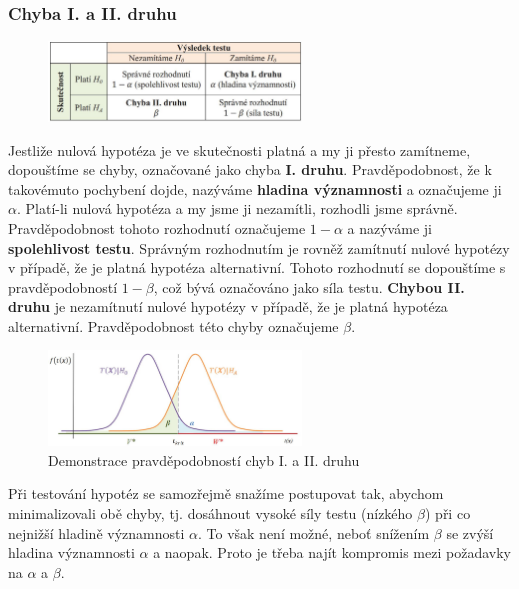 \subsubsection{Chyba I. a II. druhu}
\begin{figure}[H]
\centering
\includegraphics[width=0.6\textwidth]{assets/14_chyba_tab}
\end{figure}
Jestliže nulová hypotéza je ve skutečnosti platná a my ji přesto zamítneme, dopouštíme se chyby, označované jako chyba \textbf{I. druhu}. Pravděpodobnost, že k takovémuto pochybení dojde, nazýváme \textbf{hladina významnosti} a označujeme ji $\alpha$. Platí-li nulová hypotéza a my jsme ji nezamítli, rozhodli jsme správně. Pravděpodobnost tohoto rozhodnutí označujeme $1 − \alpha$ a nazýváme ji \textbf{spolehlivost testu}. Správným rozhodnutím je rovněž zamítnutí nulové hypotézy v případě, že je platná hypotéza alternativní. Tohoto rozhodnutí se dopouštíme s pravděpodobností $1 − \beta$, což bývá označováno jako síla testu. \textbf{Chybou II. druhu} je nezamítnutí nulové hypotézy v případě, že je platná hypotéza alternativní. Pravděpodobnost této chyby označujeme $\beta$.
\begin{figure}[H]
\centering
\includegraphics[width=0.6\textwidth]{assets/14_chyba_graf}
\caption{Demonstrace pravděpodobností chyb I. a II. druhu}
\end{figure}
Při testování hypotéz se samozřejmě snažíme postupovat tak, abychom minimalizovali obě chyby, tj. dosáhnout vysoké síly testu (nízkého $\beta$) při co nejnižší hladině významnosti $\alpha$. To však není možné, neboť snížením $\beta$ se zvýší hladina významnosti $\alpha$ a naopak. Proto je třeba najít kompromis mezi požadavky na $\alpha$ a $\beta$.


